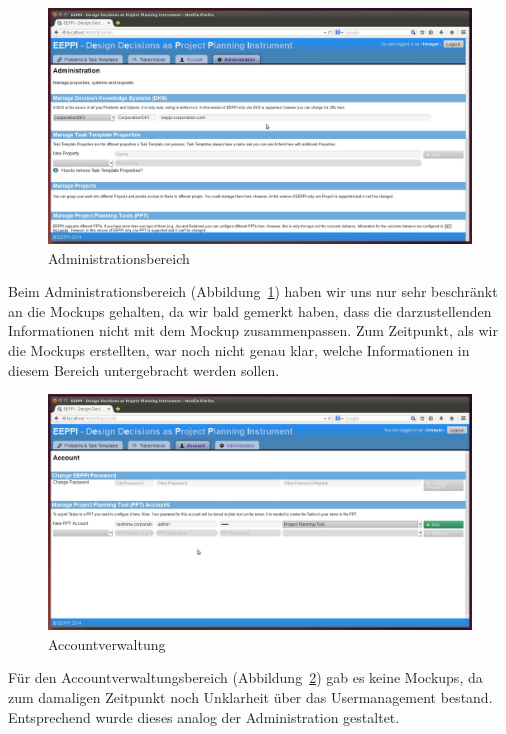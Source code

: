 		
		\begin{figure}[H]
			\centering
			\includegraphics[width=\linewidth]{tutorial/img/administrationDKS.jpg}
			\caption{Administrationsbereich}
			\label{fig:eeppiAdministration}
		\end{figure}	
		
		Beim Administrationsbereich (Abbildung~\ref{fig:eeppiAdministration}) haben wir uns nur sehr beschränkt an die Mockups gehalten, 
		da wir bald gemerkt haben, dass die darzustellenden Informationen nicht mit dem Mockup zusammenpassen.
		Zum Zeitpunkt, als wir die Mockups erstellten, 
		war noch nicht genau klar, welche Informationen in diesem Bereich untergebracht werden sollen.		
		
		
		\begin{figure}[H]
			\centering
			\includegraphics[width=\linewidth]{tutorial/img/accountPPTAccount.jpg}
			\caption{Accountverwaltung}
			\label{fig:eeppiAccountManagement}
		\end{figure}	
		
		Für den Accountverwaltungsbereich (Abbildung~\ref{fig:eeppiAccountManagement}) gab es keine Mockups, da zum damaligen Zeitpunkt noch Unklarheit über das Usermanagement bestand.
		Entsprechend wurde dieses analog der Administration gestaltet.
		
